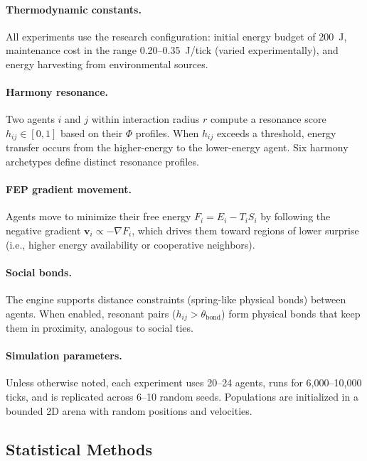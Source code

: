 \documentclass[12pt,a4paper]{article}
\begin{document}
\paragraph{Thermodynamic constants.} All experiments use the research configuration: initial energy budget of 200~J, maintenance cost in the range 0.20--0.35~J/tick (varied experimentally), and energy harvesting from environmental sources.

\paragraph{Harmony resonance.} Two agents $i$ and $j$ within interaction radius $r$ compute a resonance score $h_{ij} \in [0, 1]$ based on their $\Phi$ profiles. When $h_{ij}$ exceeds a threshold, energy transfer occurs from the higher-energy to the lower-energy agent. Six harmony archetypes define distinct resonance profiles.

\paragraph{FEP gradient movement.} Agents move to minimize their free energy $F_i = E_i - T_i S_i$ by following the negative gradient $\mathbf{v}_i \propto -\nabla F_i$, which drives them toward regions of lower surprise (i.e., higher energy availability or cooperative neighbors).

\paragraph{Social bonds.} The engine supports distance constraints (spring-like physical bonds) between agents. When enabled, resonant pairs ($h_{ij} > \theta_{\text{bond}}$) form physical bonds that keep them in proximity, analogous to social ties.

\paragraph{Simulation parameters.} Unless otherwise noted, each experiment uses 20--24 agents, runs for 6{,}000--10{,}000 ticks, and is replicated across 6--10 random seeds. Populations are initialized in a bounded 2D arena with random positions and velocities.

\subsection{Statistical Methods}
\end{document}

